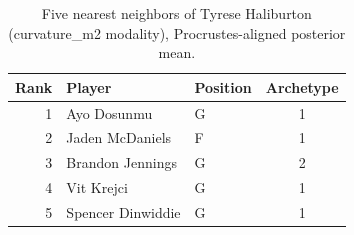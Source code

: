 \begin{table}[htbp]
  \centering\small
  \begin{tabular}{rllc}
    \toprule
    Rank & Player & Position & Archetype \\
    \midrule
    1 & Ayo Dosunmu & G & 1 \\
    2 & Jaden McDaniels & F & 1 \\
    3 & Brandon Jennings & G & 2 \\
    4 & Vit Krejci & G & 1 \\
    5 & Spencer Dinwiddie & G & 1 \\
    \bottomrule
  \end{tabular}
  \caption{Five nearest neighbors of Tyrese Haliburton (curvature_m2 modality), Procrustes-aligned posterior mean.}
  \label{tab:Tyrese_Haliburton_neighbors_curvature_m2}
\end{table}

